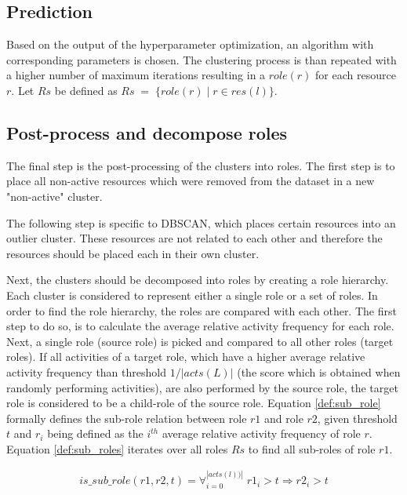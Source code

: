 \subsection{Prediction}
Based on the output of the hyperparameter optimization, an algorithm with corresponding parameters is chosen. The clustering process is than repeated with a higher number of maximum iterations resulting in a $role(r)$ for each resource $r$. Let $Rs$ be defined as $Rs \;=\; \{role(r) \; | \; r \in res(l)  \}$. 

\subsection{Post-process and decompose roles}
The final step is the post-processing of the clusters into roles. The first step is to place all non-active resources which were removed from the dataset in a new "non-active" cluster. 

The following step is specific to DBSCAN, which places certain resources into an outlier cluster. These resources are not related to each other and therefore the resources should be placed each in their own cluster. 

Next, the clusters should be decomposed into roles by creating a role hierarchy. Each cluster is considered to represent either a single role or a set of roles. In order to find the role hierarchy, the roles are compared with each other. The first step to do so, is to calculate the average relative activity frequency for each role. Next, a single role (source role) is picked and compared to all other roles (target roles). If all activities of a target role, which have a higher average relative activity frequency than threshold $1/|acts(L)|$ (the score which is obtained when randomly performing activities), are also performed by the source role, the target role is considered to be a child-role of the source role. Equation \ref{def:sub_role} formally defines the sub-role relation between role ${r1}$ and role ${r2}$, given threshold $t$ and $r_i$ being defined as the $i^{th}$ average relative activity frequency of role $r$. Equation \ref{def:sub_roles} iterates over all roles ${Rs}$ to find all sub-roles of role ${r1}$.

\begin{equation}\label{def:sub_role}
  \begin{array}{l}
    is\_sub\_role({r1},{r2}, t) = \forall_{i=0}^{|acts(l))|}  \; {r1}_i > t \Rightarrow {r2}_i > t
  \end{array}
\end{equation}

